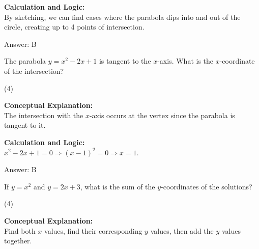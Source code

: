 \documentclass[11pt,paper=a4,answers]{exam}
\begin{document}
\begin{questions}
\begin{solution}
\vspace{20pt}

\textbf{Calculation and Logic:} \\
By sketching, we can find cases where the parabola dips into and out of the circle, creating up to 4 points of intersection.

\vspace{25pt}

Answer: \colorbox{yellow!100}{B}
\end{solution}

\vspace{40pt}

\question
The parabola $y = x^2 - 2x + 1$ is tangent to the $x$-axis. What is the $x$-coordinate of the intersection?
\begin{tasks}(4)
\end{tasks}

\begin{solution}
\textbf{Conceptual Explanation:} \\
The intersection with the $x$-axis occurs at the vertex since the parabola is tangent to it.

\vspace{20pt}

\textbf{Calculation and Logic:} \\
$x^2 - 2x + 1 = 0 \Rightarrow (x - 1)^2 = 0 \Rightarrow x = 1$.

\vspace{25pt}

Answer: \colorbox{yellow!100}{B}
\end{solution}

\vspace{40pt}

\question
If $y = x^2$ and $y = 2x + 3$, what is the sum of the $y$-coordinates of the solutions?
\begin{tasks}(4)
\end{tasks}

\begin{solution}
\textbf{Conceptual Explanation:} \\
Find both $x$ values, find their corresponding $y$ values, then add the $y$ values together.

\vspace{20pt}


\end{solution}
\end{questions}
\end{document}
